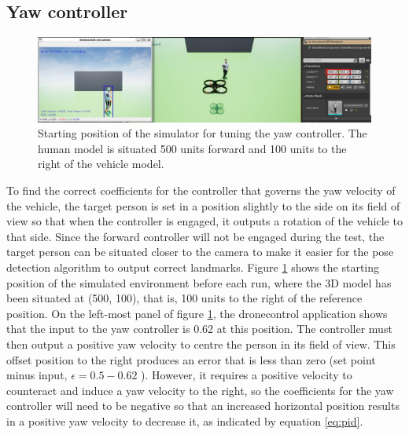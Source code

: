 \subsection{Yaw controller}

\begin{figure}
  \centering
  \includegraphics[width=\textwidth, keepaspectratio]{img/pid/tune-ref-pos-yaw.jpg}
  \caption{Starting position of the simulator for tuning the yaw controller. The human model is situated 500 units forward and 100 units to the right of the vehicle model.}
  \label{fig:tune-ref-pos-yaw}
\end{figure}

To find the correct coefficients for the controller that governs the yaw velocity of the vehicle, the target person is set in a position slightly to the side on its field of view so that when the controller is engaged, it outputs a rotation of the vehicle to that side.
Since the forward controller will not be engaged during the test, the target person can be situated closer to the camera to make it easier for the pose detection algorithm to output correct landmarks.
Figure \ref{fig:tune-ref-pos-yaw} shows the starting position of the simulated environment before each run, where the 3D model has been situated at (500, 100), that is, 100 units to the right of the reference position.
On the left-most panel of figure \ref{fig:tune-ref-pos-yaw}, the dronecontrol application shows that the input to the yaw controller is 0.62 at this position.
The controller must then output a positive yaw velocity to centre the person in its field of view. 
This offset position to the right produces an error that is less than zero (set point minus input, $\epsilon = 0.5 - 0.62$ ).
However, it requires a positive velocity to counteract and induce a yaw velocity to the right, so the coefficients for the yaw controller will need to be negative so that an increased horizontal position results in a positive yaw velocity to decrease it, as indicated by equation \ref{eq:pid}.
 

